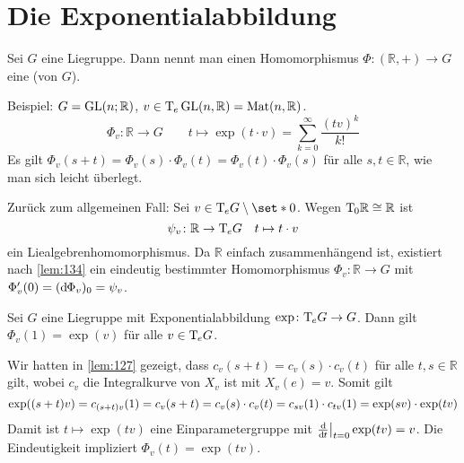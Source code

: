 \section{Die Exponentialabbildung} %
\label{sec:14}

\begin{definition}[{name=[{Einparameteruntergruppe}]}]
	Sei $G$ eine Liegruppe.
	Dann nennt man einen Homomorphismus $\Phi \colon (\mathbb{R},+) \to G$ eine  (von $G$).
\end{definition}

Beispiel: $G = \operatorname{GL}(n;\mathbb{R})$, $v \in \mathrm{T}\mkern-0.85mu_e \operatorname{GL}(n,\mathbb{R}) = \operatorname{Mat}(n,\mathbb{R})$.
\[
	\Phi_v \colon \mathbb{R} \longrightarrow G \qquad t \longmapsto \exp(t \cdot v) = \sum_{k=0}^{\infty}  \frac{(tv)^k}{k!} 
\]
Es gilt $\Phi_v(s+t) = \Phi_v(s) \cdot \Phi_v(t) = \Phi_v(t) \cdot \Phi_v(s)$ für alle $s,t \in \mathbb{R}$, wie man sich leicht überlegt.

Zurück zum allgemeinen Fall: Sei $v \in \Tmap_e G \setminus \set*{0}$.
Wegen $\mathrm{T}\mkern-0.85mu_0 \mathbb{R} \cong \mathbb{R}$ ist
\[
	\psi_v \colon \mathbb{R} \to \mathrm{T}\mkern-0.85mu_e G \quad t \mapsto t \cdot v
\]
ein Liealgebrenhomomorphismus. 
Da $\mathbb{R}$ einfach zusammenhängend ist, existiert nach \autoref{lem:134} ein eindeutig bestimmter Homomorphismus
\(
	\Phi_v \colon \mathbb{R} \to G
\)
mit $\Phi_v'(0)= (\mathrm{d}\mkern-1.0mu \Phi_v)_0 = \psi_v$.

\begin{lemma}[label=lem:142]
	Sei $G$ eine Liegruppe mit Exponentialabbildung $\exp \colon \mathrm{T}\mkern-0.85mu_e G \to G$.
	Dann gilt $\Phi_v(1) = \exp(v)$ für alle $v \in \mathrm{T}\mkern-0.85mu_e G$.
\end{lemma}
\begin{beweis}
	Wir hatten in \autoref{lem:127} gezeigt, dass $c_v(s +t) = c_v(s) \cdot c_v(t)$ für alle $t,s \in \mathbb{R}$ gilt, wobei $c_v$ die Integralkurve von $X_v$ ist mit $X_v(e)=v$.
	Somit gilt
	\[
		\exp \enbrace*{(s+t) v} = c_{(s+t)v}(1) = c_v(s+t) = c_v(s) \cdot c_v(t) = c_{sv}(1) \cdot c_{tv}(1) = \exp(sv) \cdot \exp(tv)
	\]
	Damit ist $t \mapsto \exp(tv)$ eine Einparametergruppe mit $\frac{\mathrm{d}\mkern-1.0mu }{\mathrm{d}\mkern-1.0mu t} \big|_{t=0} \exp(tv)=v$.
	Die Eindeutigkeit impliziert $\Phi_v(t)=\exp(tv)$.
\end{beweis}

